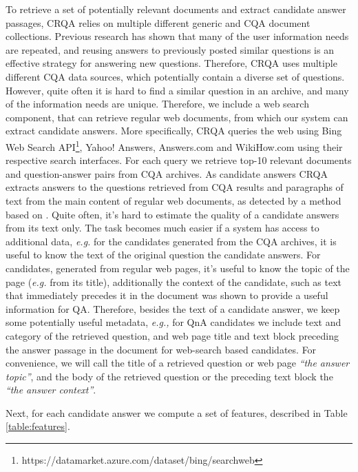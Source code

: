 To retrieve a set of potentially relevant documents and extract candidate answer passages, CRQA relies on multiple different generic and CQA document collections.
Previous research \cite{shtok2012learning} has shown that many of the user information needs are repeated, and reusing answers to previously posted similar questions is an effective strategy for answering new questions.
Therefore, CRQA uses multiple different CQA data sources, which potentially contain a diverse set of questions.
However, quite often it is hard to find a similar question in an archive, and many of the information needs are unique.
Therefore, we include a web search component, that can retrieve regular web documents, from which our system can extract candidate answers.
More specifically, CRQA queries the web using Bing Web Search API\footnote{https://datamarket.azure.com/dataset/bing/searchweb}, Yahoo! Answers, Answers.com and WikiHow.com using their respective search interfaces.
For each query we retrieve top-10 relevant documents and question-answer pairs from CQA archives.
As candidate answers CRQA extracts answers to the questions retrieved from CQA results and paragraphs of text from the main content of regular web documents, as detected by a method based on \cite{Kohlschutter_2010}.
Quite often, it's hard to estimate the quality of a candidate answers from its text only.
The task becomes much easier if a system has access to additional data, \textit{e.g.} for the candidates generated from the CQA archives, it is useful to know the text of the original question the candidate answers.
For candidates, generated from regular web pages, it's useful to know the topic of the page (\textit{e.g.} from its title), additionally the context of the candidate, such as text that immediately precedes it in the document was shown to provide a useful information for QA.
Therefore, besides the text of a candidate answer, we keep some potentially useful metadata, \textit{e.g.,} for QnA candidates we include text and category of the retrieved question, and web page title and text block preceding the answer passage in the document for web-search based candidates.
For convenience, we will call the title of a retrieved question or web page \textit{``the answer topic''}, and the body of the retrieved question or the preceding text block the \textit{``the answer context''}.

Next, for each candidate answer we compute a set of features, described in Table \ref{table:features}.

